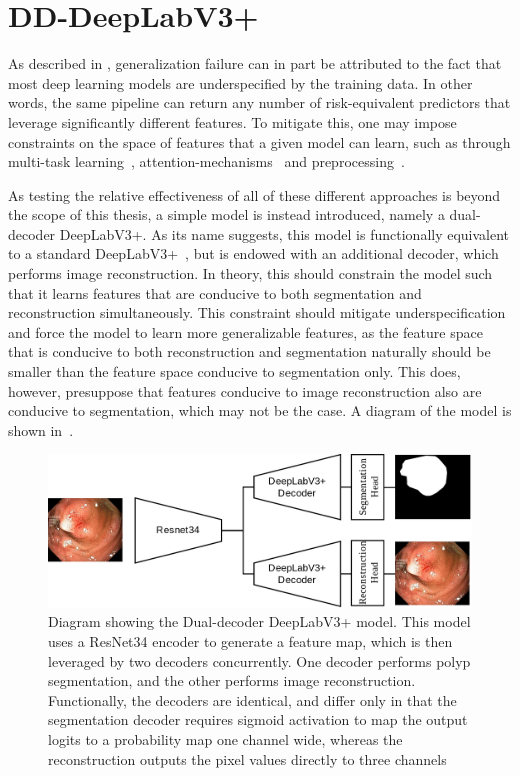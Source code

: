 \section{DD-DeepLabV3+}
As described in , generalization failure can in part be attributed to the fact that most deep learning models are underspecified by the training data. In other words, the same pipeline can return any number of risk-equivalent predictors that leverage significantly different features. To mitigate this, one may impose constraints on the space of features that a given model can learn, such as through multi-task learning~\cite{ddanet}, attention-mechanisms~\cite{attention_generalizability, reverse_attention} and preprocessing~\cite{visual_cortex}. 

As testing the relative effectiveness of all of these different approaches is beyond the scope of this thesis, a simple model is instead introduced, namely a dual-decoder DeepLabV3+. As its name suggests, this model is functionally equivalent to a standard DeepLabV3+~\cite{deeplab}, but is endowed with an additional decoder, which performs image reconstruction. In theory, this should constrain the model such that it learns features that are conducive to both segmentation and reconstruction simultaneously. This constraint should mitigate underspecification and force the model to learn more generalizable features, as the feature space that is conducive to both reconstruction and segmentation naturally should be smaller than the feature space conducive to segmentation only. This does, however, presuppose that features conducive to image reconstruction also are conducive to segmentation, which may not be the case. A diagram of the model is shown in~.
\begin{figure}[htb]
    \centering
    \includegraphics[width=\linewidth]{illustrations/InductiveNet.drawio.png}
    \caption[Dual Decoder DeepLabV3]{Diagram showing the Dual-decoder DeepLabV3+ model. This model uses a ResNet34 encoder to generate a feature map, which is then leveraged by two decoders concurrently. One decoder performs polyp segmentation, and the other performs image reconstruction. Functionally, the decoders are identical, and differ only in that the segmentation decoder requires sigmoid activation to map the output logits to a probability map one channel wide, whereas the reconstruction outputs the pixel values directly to three channels}
    \label{fig:dddeeplabv3}
\end{figure}

